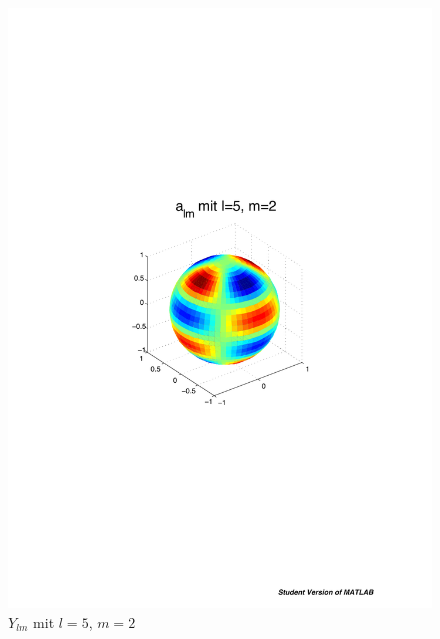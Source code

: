 \begin{refsection}
\begin{figure}
\begin{minipage}[hbt]{0.4\textwidth}
\includegraphics[width=1\textwidth]{kugel/ylm/a_5_2.pdf}
\caption{$Y_{lm}$ mit $l=5$, $m=2$}
\label{skript:ylm l=5 m=2}
\end{minipage}
\hfill
\begin{minipage}[hbt]{0.4\textwidth}
\centering

\end{minipage}
\end{figure}
\end{refsection}

